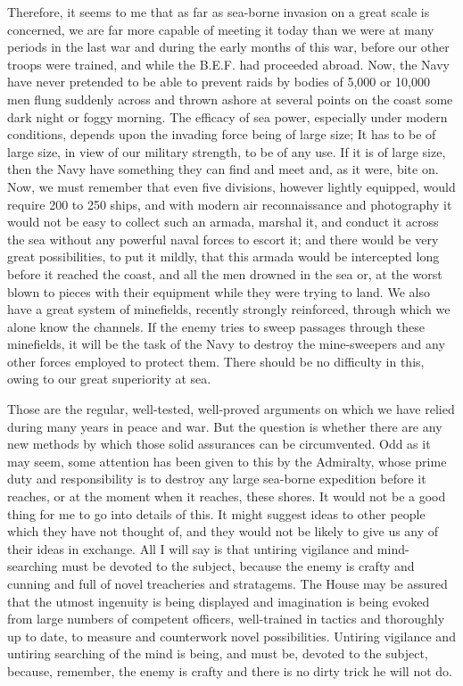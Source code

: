 \documentclass[a4paper]{amsbook}
\begin{document}
Therefore, it seems to me that as far as sea-borne invasion on a great scale is concerned, we are far more capable of meeting it today than we were at many periods in the last war and during the early months of this war, before our other troops were trained, and while the B.E.F. had proceeded abroad. Now, the Navy have never pretended to be able to prevent raids by bodies of 5,000 or 10,000 men flung suddenly across and thrown ashore at several points on the coast some dark night or foggy morning. The efficacy of sea power, especially under modern conditions, depends upon the invading force being of large size; It has to be of large size, in view of our military strength, to be of any use. If it is of large size, then the Navy have something they can find and meet and, as it were, bite on. Now, we must remember that even five divisions, however lightly equipped, would require 200 to 250 ships, and with modern air reconnaissance and photography it would not be easy to collect such an armada, marshal it, and conduct it across the sea without any powerful naval forces to escort it; and there would be very great possibilities, to put it mildly, that this armada would be intercepted long before it reached the coast, and all the men drowned in the sea or, at the worst blown to pieces with their equipment while they were trying to land. We also have a great system of minefields, recently strongly reinforced, through which we alone know the channels. If the enemy tries to sweep passages through these minefields, it will be the task of the Navy to destroy the mine-sweepers and any other forces employed to protect them. There should be no difficulty in this, owing to our great superiority at sea.

Those are the regular, well-tested, well-proved arguments on which we have relied during many years in peace and war. But the question is whether there are any new methods by which those solid assurances can be circumvented. Odd as it may seem, some attention has been given to this by the Admiralty, whose prime duty and responsibility is to destroy any large sea-borne expedition before it reaches, or at the moment when it reaches, these shores. It would not be a good thing for me to go into details of this. It might suggest ideas to other people which they have not thought of, and they would not be likely to give us any of their ideas in exchange. All I will say is that untiring vigilance and mind-searching must be devoted to the subject, because the enemy is crafty and cunning and full of novel treacheries and stratagems. The House may be assured that the utmost ingenuity is being displayed and imagination is being evoked from large numbers of competent officers, well-trained in tactics and thoroughly up to date, to measure and counterwork novel possibilities. Untiring vigilance and untiring searching of the mind is being, and must be, devoted to the subject, because, remember, the enemy is crafty and there is no dirty trick he will not do.
\end{document}
